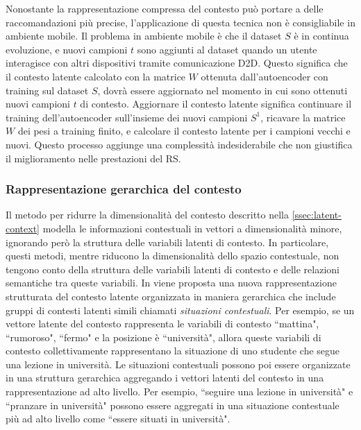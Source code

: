 Nonostante la rappresentazione compressa del contesto può portare a delle raccomandazioni più precise, l'applicazione di questa tecnica non è consigliabile in ambiente mobile. Il problema in ambiente mobile è che il dataset $S$ è in continua evoluzione, e nuovi campioni $t$ sono aggiunti al dataset quando un utente interagisce con altri dispositivi tramite comunicazione D2D. Questo significa che il contesto latente calcolato con la matrice $W$ ottenuta dall'autoencoder con training sul dataset $S$, dovrà essere aggiornato nel momento in cui sono ottenuti nuovi campioni $t$ di contesto. Aggiornare il contesto latente significa continuare il training dell'autoencoder sull'insieme dei nuovi campioni $S^1$, ricavare la matrice $W$ dei pesi a training finito, e calcolare il contesto latente per i campioni vecchi e nuovi. Questo processo aggiunge una complessità indesiderabile che non giustifica il miglioramento nelle prestazioni del RS.

\subsubsection{Rappresentazione gerarchica del contesto}
\label{ssec:hierarchical}
Il metodo per ridurre la dimensionalità del contesto descritto nella \autoref{ssec:latent-context} modella le informazioni contestuali in vettori a dimensionalità minore, ignorando però la struttura delle variabili latenti di contesto. In particolare, questi metodi, mentre riducono la dimensionalità dello spazio contestuale, non tengono conto della struttura delle variabili latenti di contesto e delle relazioni semantiche tra queste variabili. In \cite{hierarchical-context} viene proposta una nuova rappresentazione strutturata del contesto latente organizzata in maniera gerarchica che include gruppi di contesti latenti simili chiamati \textit{situazioni contestuali}. Per esempio, se un vettore latente del contesto rappresenta le variabili di contesto ``mattina", ``rumoroso", ``fermo" e la posizione è ``università", allora queste variabili di contesto collettivamente rappresentano la situazione di uno studente che segue una lezione in università. Le situazioni contestuali possono poi essere organizzate in una struttura gerarchica aggregando i vettori latenti del contesto in una rappresentazione ad alto livello. Per esempio, ``seguire una lezione in università" e ``pranzare in università" possono essere aggregati in una situazione contestuale più ad alto livello come ``essere situati in università".

